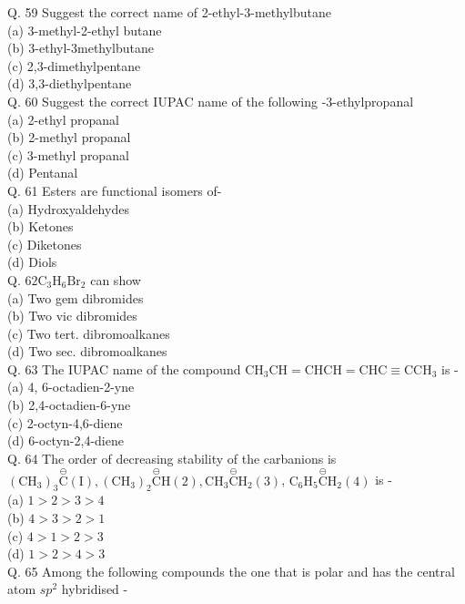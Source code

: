 \documentclass[10pt]{article}
\begin{document}
Q. 59 Suggest the correct name of 2-ethyl-3-methylbutane\\
(a) 3-methyl-2-ethyl butane\\
(b) 3-ethyl-3methylbutane\\
(c) 2,3-dimethylpentane\\
(d) 3,3-diethylpentane\\
Q. 60 Suggest the correct IUPAC name of the following -3-ethylpropanal\\
(a) 2-ethyl propanal\\
(b) 2-methyl propanal\\
(c) 3-methyl propanal\\
(d) Pentanal\\
Q. 61 Esters are functional isomers of-\\
(a) Hydroxyaldehydes\\
(b) Ketones\\
(c) Diketones\\
(d) Diols\\
Q. $62 \mathrm{C}_{3} \mathrm{H}_{6} \mathrm{Br}_{2}$ can show\\
(a) Two gem dibromides\\
(b) Two vic dibromides\\
(c) Two tert. dibromoalkanes\\
(d) Two sec. dibromoalkanes\\
Q. 63 The IUPAC name of the compound $\mathrm{CH}_{3} \mathrm{CH}=\mathrm{CHCH}=\mathrm{CHC} \equiv \mathrm{CCH}_{3}$ is -\\
(a) 4, 6-octadien-2-yne\\
(b) 2,4-octadien-6-yne\\
(c) 2-octyn-4,6-diene\\
(d) 6-octyn-2,4-diene\\
Q. 64 The order of decreasing stability of the carbanions is $\left(\mathrm{CH}_{3}\right)_{3} \stackrel{\ominus}{\mathrm{C}}(\mathrm{I}),\left(\mathrm{CH}_{3}\right)_{2} \stackrel{\ominus}{\mathrm{C}} \mathrm{H}(2), \mathrm{CH}_{3} \stackrel{\ominus}{\mathrm{C}} \mathrm{H}_{2}(3)$, $\mathrm{C}_{6} \mathrm{H}_{5} \stackrel{\ominus}{\mathrm{C}} \mathrm{H}_{2}(4)$ is -\\
(a) $1>2>3>4$\\
(b) $4>3>2>1$\\
(c) $4>1>2>3$\\
(d) $1>2>4>3$\\
Q. 65 Among the following compounds the one that is polar and has the central atom $s p^{2}$ hybridised -\\
\end{document}

